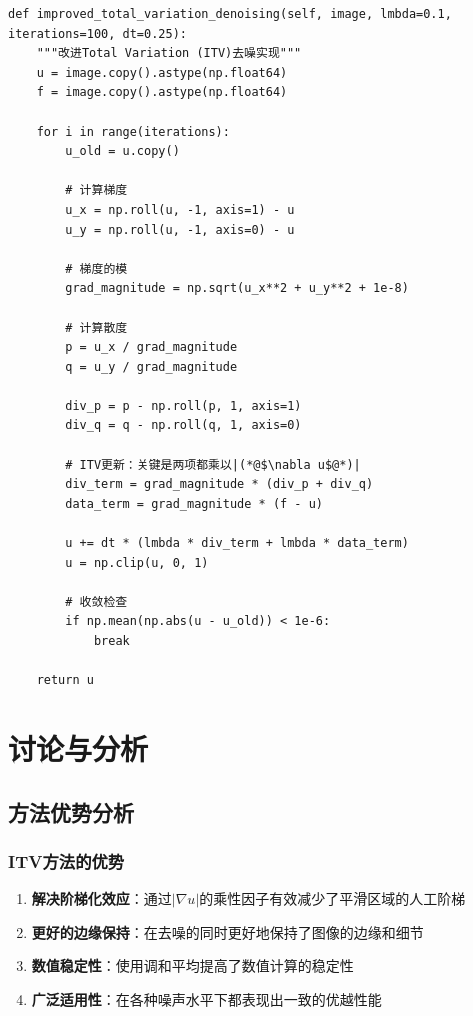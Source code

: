 \documentclass[a4paper,12pt]{ctexart}
\begin{document}
\begin{lstlisting}[caption=ITV方法核心代码,label=lst:itv]
def improved_total_variation_denoising(self, image, lmbda=0.1, iterations=100, dt=0.25):
    """改进Total Variation (ITV)去噪实现"""
    u = image.copy().astype(np.float64)
    f = image.copy().astype(np.float64)
    
    for i in range(iterations):
        u_old = u.copy()
        
        # 计算梯度
        u_x = np.roll(u, -1, axis=1) - u
        u_y = np.roll(u, -1, axis=0) - u
        
        # 梯度的模
        grad_magnitude = np.sqrt(u_x**2 + u_y**2 + 1e-8)
        
        # 计算散度
        p = u_x / grad_magnitude
        q = u_y / grad_magnitude
        
        div_p = p - np.roll(p, 1, axis=1)
        div_q = q - np.roll(q, 1, axis=0)
        
        # ITV更新：关键是两项都乘以|(*@$\nabla u$@*)|
        div_term = grad_magnitude * (div_p + div_q)
        data_term = grad_magnitude * (f - u)
        
        u += dt * (lmbda * div_term + lmbda * data_term)
        u = np.clip(u, 0, 1)
        
        # 收敛检查
        if np.mean(np.abs(u - u_old)) < 1e-6:
            break
    
    return u
\end{lstlisting}

\section{讨论与分析}

\subsection{方法优势分析}

\subsubsection{ITV方法的优势}
\begin{enumerate}
    \item \textbf{解决阶梯化效应}：通过$|\nabla u|$的乘性因子有效减少了平滑区域的人工阶梯
    \item \textbf{更好的边缘保持}：在去噪的同时更好地保持了图像的边缘和细节
    \item \textbf{数值稳定性}：使用调和平均提高了数值计算的稳定性
    \item \textbf{广泛适用性}：在各种噪声水平下都表现出一致的优越性能
\end{enumerate}
\end{document}
